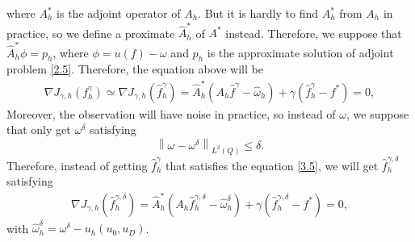 \documentclass[]{article}
\begin{document}
where $A_h^*$ is the adjoint operator of $A_h$. But it is hardly to find $A^*_h$ from $A_h$ in practice, so we define a proximate $\hat{A}_h^*$ of $A^*$ instead. Therefore, we suppose that $\hat{A}^*_h\phi=p_h$, where $\phi= u(f) - \omega$ and $p_h$ is the approximate solution of adjoint problem \eqref{2.5}. Therefore, the equation above will be
\begin{align}\label{3.4}
	\nabla J_{\gamma, h}(f^\gamma_h)\simeq\nabla J_{\gamma, h}(\hat{f}^\gamma_h)= \hat{A}_h^*(A_h\hat{f}^\gamma-\hat{\omega}_h)+\gamma(\hat{f}^\gamma_h-f^*)=0,
\end{align}
Moreover, the observation will have noise in practice, so instead of $\omega$, we suppose that only get $\omega^{\delta}$ satisfying
$$\left\| \omega-\omega^\delta\right\|_{L^2(Q)}\leq \delta.$$
Therefore, instead of getting $\hat{f}^\gamma_h$ that satisfies the equation \eqref{3.5}, we will get $\hat{f}^{\gamma, \delta}_h$ satisfying
\begin{align}\label{3.5}
	\nabla J_{\gamma, h}\left(\hat{f}^{\gamma, \delta}_h\right)= \hat{A}_h^*(A_h\hat{f}^{\gamma, \delta}_h-\hat{\omega}_h^\delta)+\gamma(\hat{f}^{\gamma, \delta}_h-f^*)=0,
\end{align}
with $\hat{\omega}_h^\delta=\omega^\delta- u_h(u_0, u_D)$.
\end{document}
